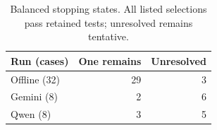 \begin{table}[t]
\centering
\caption{Balanced stopping states. All listed selections pass retained tests; unresolved remains tentative.}
\label{tab:stopping_reasons}
\footnotesize
\begin{tabularx}{\columnwidth}{@{}Xrr@{}}
\toprule
Run (cases) & One remains & Unresolved \\ \midrule
Offline (32) & 29 & 3 \\
Gemini (8) & 2 & 6 \\
Qwen (8) & 3 & 5 \\
\bottomrule
\end{tabularx}
\end{table}
